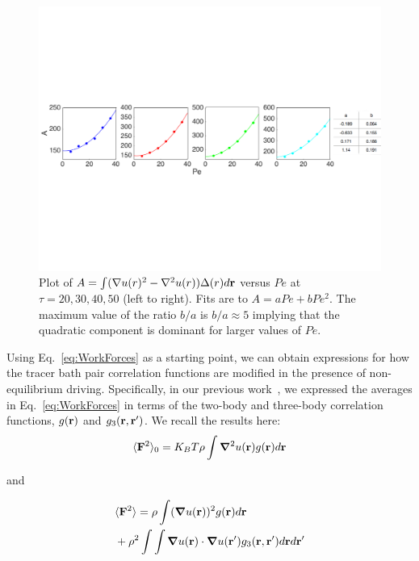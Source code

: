 \documentclass[pre,amsmath,preprintnumbers,10pt,article,notitlepage,twocolumn]{revtex4-1}
\begin{document}
\begin{figure}[tbp]
\centering
\includegraphics[width=1\linewidth]{integral_A2.pdf}
\caption{Plot of $A = \int (\nabla u(r)^2 - \nabla^2 u(r))  \Delta(r) d{\bf r}$ versus $Pe$ at $\tau = 20, 30, 40, 50$ (left to right). Fits are to $A = a Pe + b Pe^2$. The maximum value of the ratio $b/a$ is $b/a \approx 5$ implying that the quadratic component is dominant for larger values of $Pe$.}
\label{fig:integral_A}
\end{figure}

Using Eq.~\ref{eq:WorkForces} as a starting point, we can obtain expressions for how the tracer bath pair correlation functions are modified in the presence of non-equilibrium driving. Specifically, in our previous work~\cite{delJunco2018}, we expressed the averages in Eq.~\ref{eq:WorkForces} in terms of the two-body and three-body correlation functions, $g({\bf r})$ and $g_3({\bf r}, {\bf r}')$.  We recall the results here:
\begin{equation}
\langle {\bf F}^2 \rangle_0 =  K_B T \rho \int  \grad^2 u({\bf r})  g({\bf r}) d{\bf r} \label{eq:fsqzerofinal}
\end{equation}

and 

\begin{equation}
\begin{split}
&\langle {\bf F}^2 \rangle =  \rho \int (\grad u({\bf r}))^2 g({\bf r})  d{\bf r} \\& + \rho^2 \int  \int  \grad u({\bf r}) \cdot  \grad u({\bf r}')  g_3({\bf r}, {\bf r}') d{\bf r} d{\bf r}' \label{eq:Fsq}
\end{split}
\end{equation}
\end{document}
